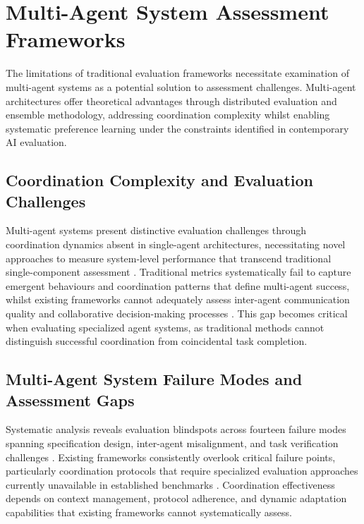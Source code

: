 \section{Multi-Agent System Assessment Frameworks}

The limitations of traditional evaluation frameworks necessitate examination of multi-agent systems as a potential solution to assessment challenges. Multi-agent architectures offer theoretical advantages through distributed evaluation and ensemble methodology, addressing coordination complexity whilst enabling systematic preference learning under the constraints identified in contemporary AI evaluation.

\subsection{Coordination Complexity and Evaluation Challenges}

Multi-agent systems present distinctive evaluation challenges through coordination dynamics absent in single-agent architectures, necessitating novel approaches to measure system-level performance that transcend traditional single-component assessment \cite{guo2024llm_multiagent}. Traditional metrics systematically fail to capture emergent behaviours and coordination patterns that define multi-agent success, whilst existing frameworks cannot adequately assess inter-agent communication quality and collaborative decision-making processes \cite{yan2025beyond_selftalk, ma2024agentboard}. This gap becomes critical when evaluating specialized agent systems, as traditional methods cannot distinguish successful coordination from coincidental task completion.

\subsection{Multi-Agent System Failure Modes and Assessment Gaps}

Systematic analysis reveals evaluation blindspots across fourteen failure modes spanning specification design, inter-agent misalignment, and task verification challenges \cite{cemri2025multiagent_failure}. Existing frameworks consistently overlook critical failure points, particularly coordination protocols that require specialized evaluation approaches currently unavailable in established benchmarks \cite{krishnan2025mcp_coordination}. Coordination effectiveness depends on context management, protocol adherence, and dynamic adaptation capabilities that existing frameworks cannot systematically assess.

